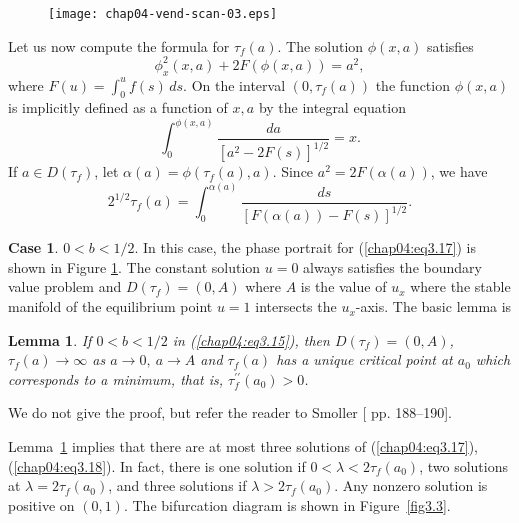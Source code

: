 \documentclass{surv-l}
\theoremstyle{plain}
\newtheorem{lemma}[theorem]{Lemma}
\theoremstyle{definition}
\newtheorem{case}{Case}
\numberwithin{equation}{section}
\numberwithin{figure}{chapter}
\begin{document}
\begin{figure}
\texttt{[image: chap04-vend-scan-03.eps]}
\caption{}
\label{fig3.2}
\end{figure}


Let us now compute the formula for $\tau_{f}(a)$. The solution $\phi(x, a)$ satisfies
\begin{equation}\label{chap04:eq3.19}
\phi_{x}^{2}(x, a)+2F(\phi(x, a))=a^{2},
\end{equation}
where $F(u)=\int_{0}^{u}f(s)\, ds$. On the interval $(0, \tau_{f}(a))$ the function $\phi(x, a)$ is implicitly defined as a function of $x, a$ by the integral equation
\begin{equation*}
\int_{0}^{\phi(x,a)}\frac{da}{[a^{2}-2F(s)]^{1/2}}=x.
\end{equation*}
If $a\in D(\tau_{f})$, let $\alpha({a})=\phi(\tau_{f}(a), a)$. Since $a^{2}=2F(\alpha(a))$, we have
\begin{equation}\label{chap04:eq3.20}
2^{1/2}\tau_{f}(a)=\int_{0}^{\alpha(a)}\frac{ds}{[F(\alpha(a))-F(s)]^{1/2}}.
\end{equation}

\begin{case}\label{case1} $0<b<1/2$. In this case, the phase portrait for (\ref{chap04:eq3.17}) is shown in Figure \ref{fig3.2}. The constant solution $u=0$ always satisfies the boundary value problem and $D(\tau_{f})=(0, A)$ where $A$ is the value of $u_{x}$ where the stable manifold of the equilibrium point $u=1$ intersects the $u_{x}$-axis. The basic lemma is
\end{case}

\begin{lemma}\label{lem4.3.7} If $0<b<1/2$ in \emph{(\ref{chap04:eq3.15})}, then $D(\tau_{f})=(0, A)$, $\tau_{f}(a)\rightarrow\infty$ as $a\rightarrow 0,\ a\rightarrow A$ and $\tau_{f}(a)$ has a unique critical point at $a_{0}$ which corresponds to a minimum, that is, $\tau_{f}^{\prime\prime}(a_{0})>0$.
\end{lemma}

We do not give the proof, but refer the reader to Smoller [\citeyear{1983s} pp. 188--190].

Lemma~\ref{lem4.3.7} implies that there are at most three solutions of (\ref{chap04:eq3.17}), (\ref{chap04:eq3.18}). In fact, there is one solution if $0<\lambda<2\tau_{f}(a_{0})$, two solutions at $\lambda=2\tau_{f}(a_{0})$, and three solutions if $\lambda>2\tau_{f}(a_{0})$. Any nonzero solution is positive on $(0,1)$. The bifurcation diagram is shown in Figure~\ref{fig3.3}.
\end{document}
